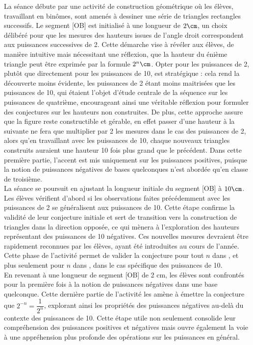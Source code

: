 La séance débute par une activité de construction géométrique où les élèves,
travaillant en binômes,
sont amenés à dessiner une série de triangles rectangles successifs.
Le segment [OB] est initialisé à une longueur de $2\cm$,
un choix délibéré pour que les mesures des hauteurs issues de l'angle droit correspondent aux puissances successives de 2.
Cette démarche vise à révéler aux élèves,
de manière intuitive mais nécessitant une réflexion,
que la hauteur du énième triangle peut être exprimée par la formule $2^n\cm$.
Opter pour les puissances de 2,
plutôt que directement pour les puissances de 10,
est stratégique :
cela rend la découverte moins évidente,
les puissances de 2 étant moins maitrisées que les puissances de 10,
qui étaient l'objet d'étude centrale de la séquence sur les puissances de quatrième,
encourageant ainsi une véritable réflexion pour formuler des conjectures sur les hauteurs non construites.
De plus,
cette approche assure que la figure reste constructible et gérable,
en effet passer d'une hauteur à la suivante ne fera que multiplier par 2 les mesures dans le cas des puissances de 2,
alors qu'en travaillant avec les puissances de 10, chaque nouveaux triangles construits auraient une hauteur 10 fois plus grand que le précédent.
Dans cette première partie,
l'accent est mis uniquement sur les puissances positives,
puisque la notion de puissances négatives de bases quelconques n'est abordée qu'en classe de troisième.\\

La séance se poursuit en ajustant la longueur initiale du segment [OB] à $10\cm$.
Les élèves vérifient d'abord si les observations faites précédemment avec les puissances de 2 se généralisent aux puissances de 10.
Cette étape confirme la validité de leur conjecture initiale et sert de transition vers la construction de triangles dans la direction opposée,
ce qui mènera à l'exploration des hauteurs représentant des puissances de 10 négatives.
Ces nouvelles mesures devraient être rapidement reconnues par les élèves,
ayant été introduites au cours de l'année.
Cette phase de l'activité permet de valider la conjecture pour tout $n$ dans ,
et plus seulement pour $n$ dans ,
dans le cas spécifique des puissances de 10.\\

En revenant à une longueur de segment [OB] de 2 cm,
les élèves sont confrontés pour la première fois à la notion de puissances négatives dans une base quelconque.
Cette dernière partie de l'activité les amène à émettre la conjecture que $2^{-n}=\dfrac{1}{2^n}$,
explorant ainsi les propriétés des puissances négatives au-delà du contexte des puissances de 10.
Cette étape utile non seulement consolide leur compréhension des puissances positives et négatives mais ouvre également la voie à une appréhension plus profonde des opérations sur les puissances en général.

